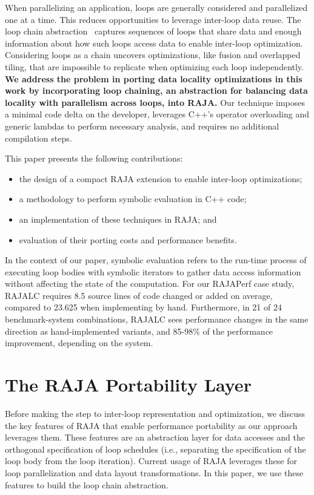 When parallelizing an application, loops are generally considered and
parallelized one at a time.
This reduces opportunities to leverage inter-loop data reuse.
The loop chain abstraction~\cite{krieger2013} captures sequences of loops that share 
data and enough information about how such loops access 
data to enable inter-loop optimization.
Considering loops as a chain uncovers optimizations, like fusion
and overlapped tiling, that are impossible to replicate when optimizing
each loop independently.
\textbf{We address the problem in porting data locality optimizations in this
work by incorporating loop chaining, an abstraction for balancing data locality
with parallelism across loops, into RAJA.}
Our technique imposes a minimal code delta on the developer, leverages C++'s
operator overloading and generic lambdas to perform necessary analysis, and
requires no additional compilation steps.  %


This paper presents the following contributions:
\begin{itemize}
\item the design of a compact RAJA extension to enable inter-loop
      optimizations;
\item a methodology to perform symbolic evaluation in C++ code;
\item an implementation of these techniques in RAJA; and
\item evaluation of their porting costs and performance benefits.
\end{itemize}

In the context of our paper, symbolic evaluation refers to the run-time process of executing loop bodies with symbolic iterators to gather data access information without affecting the state of the computation.  
For our RAJAPerf case study, RAJALC requires 8.5 source lines of code changed or added on average, compared to 23.625 when implementing by hand.
Furthermore, in 21 of 24 benchmark-system combinations, RAJALC sees performance changes in the same direction as hand-implemented variants, and 85-98\% of the performance improvement, depending on the system.

\section{The RAJA Portability Layer}

Before making the step to inter-loop representation and optimization,
we discuss the key features of RAJA that enable performance portability
as our approach leverages them.
These features are an abstraction layer for data accesses and the
orthogonal specification of loop schedules
(i.e., separating the specification of the loop body from the loop iteration).
Current usage of RAJA leverages these for loop parallelization and
data layout transformations.
In this paper, we use these features to build the loop chain abstraction.

